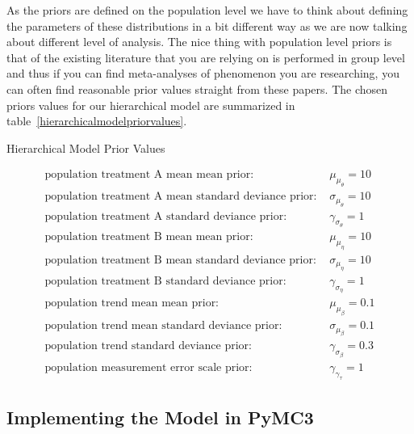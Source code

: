\documentclass[12pt,a4paper,leqno]{report}
\theoremstyle{plain}
\theoremstyle{definition}
\theoremstyle{remark}
\begin{document}
As the priors are defined on the population level we have to think about defining the
parameters of these distributions in a bit different way as we are now talking about
different level of analysis. The nice thing with population level priors is that of the
existing literature that you are relying on is performed in group level and thus if you
can find meta-analyses of phenomenon you are researching, you can often find reasonable
prior values straight from these papers. The chosen priors values for our hierarchical
model are summarized in table\ \ref{hierarchicalmodelpriorvalues}.

\begin{table}[H]
    \caption{Hierarchical Model Prior Values}
    \label{hierarchicalmodelpriorvalues}
    \begin{align}\label{}
        \text{population treatment A mean mean prior: } & \mu_{\mu_{\theta}} = 10 \nonumber \\
        \text{population treatment A mean standard deviance prior: } & \sigma_{\mu_{\theta}} = 10 \nonumber \\
        \text{population treatment A standard deviance prior: } & \gamma_{\sigma_{\theta}} = 1 \nonumber \\
        \text{population treatment B mean mean prior: } & \mu_{\mu_{\eta}} = 10 \nonumber \\
        \text{population treatment B mean standard deviance prior: } & \sigma_{\mu_{\eta}} = 10 \nonumber \\
        \text{population treatment B standard deviance prior: } & \gamma_{\sigma_{\eta}} = 1 \nonumber \\
        \text{population trend mean mean prior: } & \mu_{\mu_{\beta}} = 0.1 \nonumber \\
        \text{population trend mean standard deviance prior: } & \sigma_{\mu_{\beta}} = 0.1 \nonumber \\
        \text{population trend standard deviance prior: } & \gamma_{\sigma_{\beta}} = 0.3 \nonumber \\
        \text{population measurement error scale prior: } & \gamma_{\gamma_{\tau}} = 1 \nonumber
    \end{align}
\end{table}


\subsection{Implementing the Model in PyMC3}
\end{document}
